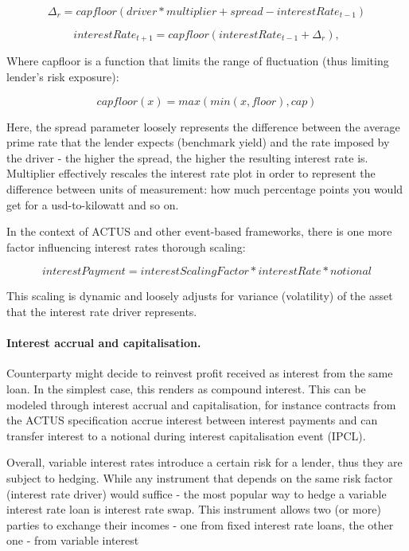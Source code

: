 \documentclass[runningheads]{llncs}
\begin{document}
\noindent 
\begin{equation}
\Delta_{r}=capfloor(driver*multiplier+spread-interestRate_{t-1})
\end{equation}

\noindent 
\begin{equation}
interestRate_{t+1}=capfloor(interestRate_{t-1}+\Delta_{r}),
\end{equation}

Where capfloor is a function that limits the range of fluctuation
(thus limiting lender's risk exposure):

\noindent 
\begin{equation}
capfloor(x)=max(min(x,floor),cap)
\end{equation}

Here, the spread parameter loosely represents the difference between
the average prime rate that the lender expects (benchmark yield) and
the rate imposed by the driver - the higher the spread, the higher
the resulting interest rate is. Multiplier effectively rescales the
interest rate plot in order to represent the difference between units
of measurement: how much percentage points you would get for a usd-to-kilowatt
and so on.

In the context of ACTUS and other event-based frameworks, there is
one more factor influencing interest rates thorough scaling:

\noindent 
\begin{equation}
interestPayment=interestScalingFactor*interestRate*notional
\end{equation}

This scaling is dynamic and loosely adjusts for variance (volatility)
of the asset that the interest rate driver represents.

\paragraph*{Interest accrual and capitalisation. }

Counterparty might decide to reinvest profit received as interest
from the same loan. In the simplest case, this renders as compound
interest. This can be modeled through interest accrual and capitalisation,
for instance contracts from the ACTUS specification accrue interest
between interest payments and can transfer interest to a notional
during interest capitalisation event (IPCL).

Overall, variable interest rates introduce a certain risk for a lender,
thus they are subject to hedging. While any instrument that depends
on the same risk factor (interest rate driver) would suffice - the
most popular way to hedge a variable interest rate loan is interest
rate swap. This instrument allows two (or more) parties to exchange
their incomes - one from fixed interest rate loans, the other one
- from variable interest
\end{document}
